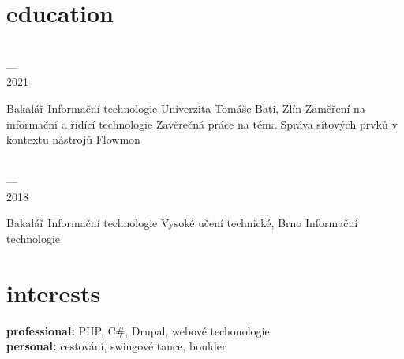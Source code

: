 \documentclass[]{friggeri-cv} %
\begin{document}
\section{education}

\begin{entrylist}
    \entry
    {\parbox[t]{2cm}{ \\ --- \\ 2021}}
    {Bakalář {\normalfont Informační technologie}}
    {Univerzita Tomáše Bati, Zlín}
    {
        \thesis
        {Zaměření na informační a řidící technologie}
        {Zavěrečná práce na téma Správa síťových prvků v kontextu nástrojů Flowmon\medskip}
    }

    \entry
    {\parbox[t]{2cm}{ \\ --- \\ 2018}}
    {Bakalář {\normalfont Informační technologie}}
    {Vysoké učení technické, Brno}
    {Informační technologie}
\end{entrylist}



\section{interests}

\textbf{professional:} PHP, C\#, Drupal, webové techonologie \\
\textbf{personal:} cestování, swingové tance, boulder
\end{document}
